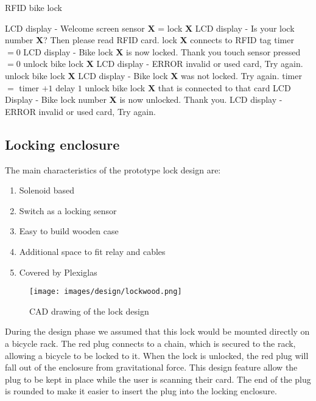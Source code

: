 \begin{algorithm}[H]
\caption{RFID bike lock}
\begin{algorithmic} 
\STATE LCD display - Welcome screen
\STATE
{}
\STATE sensor \textbf{X} = lock \textbf{X} 
\STATE LCD display - Is your lock number \textbf{X}? Then please read RFID card.
\STATE
{}
\STATE lock \textbf{X} connects to RFID tag
\STATE timer $= 0$
\STATE LCD display - Bike lock \textbf{X} is now locked. Thank you
\STATE touch sensor pressed $= 0$
\STATE unlock bike lock \textbf{X}
\STATE LCD display - ERROR invalid or used card, Try again.
\ENDIF
\STATE
{}
\STATE unlock bike lock \textbf{X}
\STATE LCD display - Bike lock \textbf{X} was not locked. Try again.
\ELSE
\STATE timer $=$ timer $+1$
\ENDIF
\STATE
\STATE delay $1$
\ENDWHILE
\STATE
{}
\STATE unlock bike lock \textbf{X} that is connected to that card
\STATE LCD Display - Bike lock number \textbf{X} is now unlocked. Thank you.
\ELSE
\STATE LCD display - ERROR invalid or used card, Try again.
\ENDIF
\ENDIF
\end{algorithmic}
\end{algorithm}

\clearpage

\subsection{Locking enclosure}

The main characteristics of the prototype lock design are:

\begin{enumerate}	
	\item Solenoid based
	\item Switch as a locking sensor
	\item Easy to build wooden case
	\item Additional space to fit relay and cables
	\item Covered by Plexiglas
\end{enumerate}

\begin{figure}[H]
	\centering
	\texttt{[image: images/design/lockwood.png]}
	\caption{CAD drawing of the lock design}
	\label{fig.cadlock}
\end{figure}

During the design phase we assumed that this lock would be mounted directly on a bicycle rack. The red plug connects to a chain, which is secured to the rack, allowing a bicycle to be locked to it. When the lock is unlocked, the red plug will fall out of the enclosure from gravitational force. This design feature allow the plug to be kept in place while the user is scanning their card. The end of the plug is rounded to make it easier to insert the plug into the locking enclosure.
